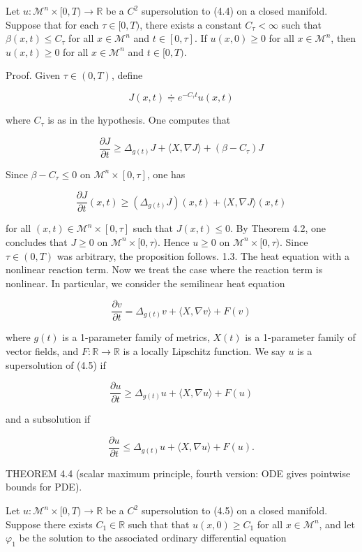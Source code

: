 \documentclass[10pt, letterpaper]{article}
\begin{document}
Let $u: \mathcal{M}^n \times[0, T) \rightarrow \mathbb{R}$ be a $C^2$ supersolution to (4.4) on a closed manifold. Suppose that for each $\tau \in[0, T)$, there exists a constant $C_\tau<\infty$ such that $\beta(x, t) \leq C_\tau$ for all $x \in \mathcal{M}^n$ and $t \in[0, \tau]$. If $u(x, 0) \geq 0$ for all $x \in \mathcal{M}^n$, then $u(x, t) \geq 0$ for all $x \in \mathcal{M}^n$ and $t \in[0, T)$.

Proof. Given $\tau \in(0, T)$, define

$$
J(x, t) \doteqdot e^{-C_\tau t} u(x, t)
$$

where $C_\tau$ is as in the hypothesis. One computes that

$$
\frac{\partial J}{\partial t} \geq \Delta_{g(t)} J+\langle X, \nabla J\rangle+\left(\beta-C_\tau\right) J
$$


Since $\beta-C_\tau \leq 0$ on $\mathcal{M}^n \times[0, \tau]$, one has

$$
\frac{\partial J}{\partial t}(x, t) \geq\left(\Delta_{g(t)} J\right)(x, t)+\langle X, \nabla J\rangle(x, t)
$$

for all $(x, t) \in \mathcal{M}^n \times[0, \tau]$ such that $J(x, t) \leq 0$. By Theorem 4.2, one concludes that $J \geq 0$ on $\mathcal{M}^n \times[0, \tau)$. Hence $u \geq 0$ on $\mathcal{M}^n \times[0, \tau)$. Since $\tau \in(0, T)$ was arbitrary, the proposition follows.
1.3. The heat equation with a nonlinear reaction term. Now we treat the case where the reaction term is nonlinear. In particular, we consider the semilinear heat equation

$$
\frac{\partial v}{\partial t}=\Delta_{g(t)} v+\langle X, \nabla v\rangle+F(v)
$$

where $g(t)$ is a 1-parameter family of metrics, $X(t)$ is a 1-parameter family of vector fields, and $F: \mathbb{R} \rightarrow \mathbb{R}$ is a locally Lipschitz function. We say $u$ is a supersolution of (4.5) if

$$
\frac{\partial u}{\partial t} \geq \Delta_{g(t)} u+\langle X, \nabla u\rangle+F(u)
$$

and a subsolution if

$$
\frac{\partial u}{\partial t} \leq \Delta_{g(t)} u+\langle X, \nabla u\rangle+F(u) .
$$


THEOREM 4.4 (scalar maximum principle, fourth version: ODE gives pointwise bounds for PDE). 

Let $u: \mathcal{M}^n \times[0, T) \rightarrow \mathbb{R}$ be a $C^2$ supersolution to (4.5) on a closed manifold. Suppose there exists $C_1 \in \mathbb{R}$ such that that $u(x, 0) \geq C_1$ for all $x \in \mathcal{M}^n$, and let $\varphi_1$ be the solution to the associated ordinary differential equation
\end{document}
